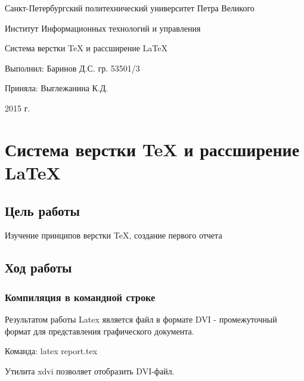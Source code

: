 \documentclass[a4paper, 12pt]{article}
\begin{document}
\begin{titlepage} \begin{center}

	\Large			
Санкт-Петербургский политехнический университет Петра Великого
			
	\vspace{0.2cm}	
Институт Информационных технологий и управления

	\vspace{2cm} \vfill \huge
Система верстки \TeX{} и рассширение \LaTeX{}

\vfill 

\begin{flushleft} \large \hangindent=8cm 
Выполнил: Баринов Д.С. гр. 53501/3 \hrulefill

Приняла: Выглежанина К.Д. \hrulefill
\end{flushleft}

		
\vspace{2cm} \vfill \large
2015 г.
		

\end{center} \end{titlepage}

\newpage

\section{Система верстки \TeX{} и рассширение \LaTeX{}}

\subsection{Цель работы}

Изучение принципов верстки \TeX{}, создание первого отчета 

\subsection{Ход работы}

\subsubsection{Компиляция в командной строке}


Результатом работы Latex является файл в формате DVI - промежуточный формат для представления графического документа.

Команда: latex report.tex

Утилита xdvi позволяет отобразить DVI-файл.
\end{document}
